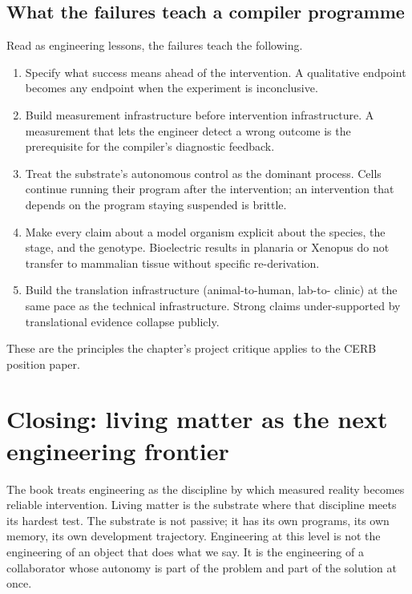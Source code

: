 \subsection{What the failures teach a compiler programme}

Read as engineering lessons, the failures teach the following.

\begin{enumerate}[leftmargin=*]
\item Specify what success means ahead of the intervention. A
qualitative endpoint becomes any endpoint when the experiment is
inconclusive.
\item Build measurement infrastructure before intervention
infrastructure. A measurement that lets the engineer detect a wrong
outcome is the prerequisite for the compiler's diagnostic feedback.
\item Treat the substrate's autonomous control as the dominant
process. Cells continue running their program after the intervention;
an intervention that depends on the program staying suspended is
brittle.
\item Make every claim about a model organism explicit about the
species, the stage, and the genotype. Bioelectric results in planaria
or Xenopus do not transfer to mammalian tissue without specific
re-derivation.
\item Build the translation infrastructure (animal-to-human, lab-to-
clinic) at the same pace as the technical infrastructure. Strong
claims under-supported by translational evidence collapse publicly.
\end{enumerate}

These are the principles the chapter's project critique applies to the
CERB position paper.

\section{Closing: living matter as the next engineering frontier}

The book treats engineering as the discipline by which measured reality
becomes reliable intervention. Living matter is the substrate where
that discipline meets its hardest test. The substrate is not passive;
it has its own programs, its own memory, its own development
trajectory. Engineering at this level is not the engineering of an
object that does what we say. It is the engineering of a collaborator
whose autonomy is part of the problem and part of the solution at once.

